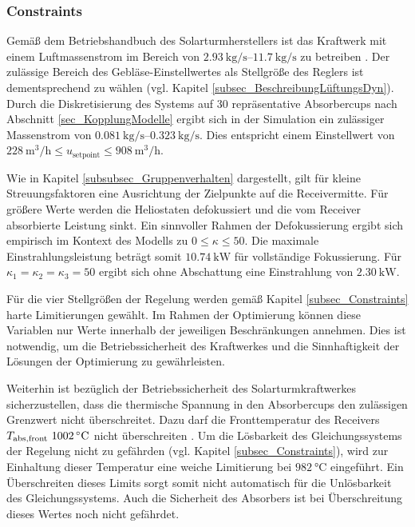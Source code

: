 \subsubsection*{Constraints} \label{subsubsec_constraints}
Gemäß dem Betriebshandbuch des Solarturmherstellers ist das Kraftwerk mit einem Luftmassenstrom im Bereich von $\SIrange{2.93}{11.7}{\kilo\gram\per\second}$ zu betreiben \cite[S.28]{HandbuchJülich}.
Der zulässige Bereich des Gebläse-Einstellwertes als Stellgröße des Reglers ist dementsprechend zu wählen (vgl. Kapitel \ref{subsec_BeschreibungLüftungsDyn}).
Durch die Diskretisierung des Systems auf 30 repräsentative Absorbercups nach Abschnitt \ref{sec_KopplungModelle} ergibt sich in der Simulation ein zulässiger Massenstrom von $\SIrange{0.081}{0.323}{\kilo\gram\per\second}$.
Dies entspricht einem Einstellwert von $\SI{228}{\metre\cubed\per\hour} \leq u_{\mathrm{setpoint}} \leq \SI{908}{\metre\cubed\per\hour}$.

Wie in Kapitel \ref{subsubsec_Gruppenverhalten} dargestellt, gilt für kleine Streuungsfaktoren eine Ausrichtung der Zielpunkte auf die Receivermitte.
Für größere Werte werden die Heliostaten defokussiert und die vom Receiver absorbierte Leistung sinkt.
Ein sinnvoller Rahmen der Defokussierung ergibt sich empirisch im Kontext des Modells zu $0 \leq \kappa \leq 50$.
Die maximale Einstrahlungsleistung beträgt somit $\SI{10.74}{\kilo\watt}$ für vollständige Fokussierung.
Für $\kappa_1 = \kappa_2 = \kappa_3 = 50$ ergibt sich ohne Abschattung eine Einstrahlung von $\SI{2.30}{\kilo\watt}$.

Für die vier Stellgrößen der Regelung werden gemäß Kapitel \ref{subsec_Constraints} harte Limitierungen gewählt.
Im Rahmen der Optimierung können diese Variablen nur Werte innerhalb der jeweiligen Beschränkungen annehmen.
Dies ist notwendig, um die Betriebssicherheit des Kraftwerkes und die Sinnhaftigkeit der Lösungen der Optimierung zu gewährleisten.

Weiterhin ist bezüglich der Betriebssicherheit des Solarturmkraftwerkes sicherzustellen, dass die thermische Spannung in den Absorbercups den zulässigen Grenzwert nicht überschreitet.
Dazu darf die Fronttemperatur des Receivers $T_{\mathrm{abs,front}}~\SI{1002}{\celsius}$ nicht überschreiten \cite[S.29]{HandbuchJülich}.
Um die Lösbarkeit des Gleichungssystems der Regelung nicht zu gefährden (vgl. Kapitel \ref{subsec_Constraints}), wird zur Einhaltung dieser Temperatur eine weiche Limitierung bei $\SI{982}{\celsius}$ eingeführt.
Ein Überschreiten dieses Limits sorgt somit nicht automatisch für die Unlösbarkeit des Gleichungssystems.
Auch die Sicherheit des Absorbers ist bei Überschreitung dieses Wertes noch nicht gefährdet.

